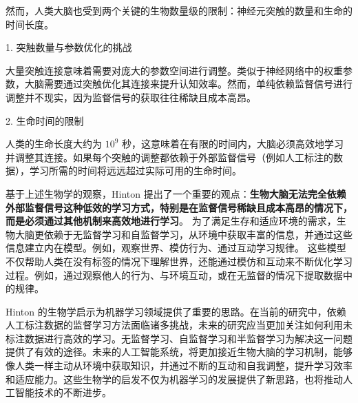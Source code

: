 {{然而，人类大脑也受到两个关键的生物数量级的限制：神经元突触的数量和生命的时间长度。%

1. 突触数量与参数优化的挑战

大量突触连接意味着需要对庞大的参数空间进行调整。类似于神经网络中的权重参数，大脑需要通过突触优化其连接来提升认知效率。然而，单纯依赖监督信号进行调整并不现实，因为监督信号的获取往往稀缺且成本高昂。

2. 生命时间的限制

人类的生命长度大约为 $10^9$ 秒，这意味着在有限的时间内，大脑必须高效地学习并调整其连接。如果每个突触的调整都依赖于外部监督信号（例如人工标注的数据），学习所需的时间将远远超过实际可用的生命时间。

基于上述生物学的观察，Hinton 提出了一个重要的观点：{\bf 生物大脑无法完全依赖外部监督信号这种低效的学习方式，特别是在监督信号稀缺且成本高昂的情况下，而是必须通过其他机制来高效地进行学习}。
为了满足生存和适应环境的需求，生物大脑更依赖于无监督学习和自监督学习，从环境中获取丰富的信息，并通过这些信息建立内在模型。例如，观察世界、模仿行为、通过互动学习规律。
这些模型不仅帮助人类在没有标签的情况下理解世界，还能通过模仿和互动来不断优化学习过程。例如，通过观察他人的行为、与环境互动，或在无监督的情况下提取数据中的规律。


Hinton 的生物学启示为机器学习领域提供了重要的思路。在当前的研究中，依赖人工标注数据的监督学习方法面临诸多挑战，未来的研究应当更加关注如何利用未标注数据进行高效的学习。无监督学习、自监督学习和半监督学习为解决这一问题提供了有效的途径。未来的人工智能系统，将更加接近生物大脑的学习机制，能够像人类一样主动从环境中获取知识，并通过不断的互动和自我调整，提升学习效率和适应能力。这些生物学的启发不仅为机器学习的发展提供了新思路，也将推动人工智能技术的不断进步。}


%
%
%
%

}
